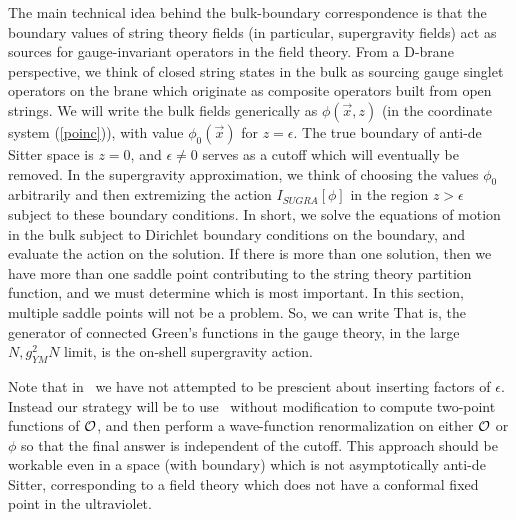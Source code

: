 The main technical idea behind the bulk-boundary correspondence is that the
boundary values of string theory fields (in particular, supergravity
fields) act as sources for gauge-invariant operators in the field theory.
From a D-brane perspective, we think of closed string states in the bulk as
sourcing gauge singlet operators on the brane which originate as composite
operators built from open strings.  We will write the bulk fields
generically as $\phi(\vec{x},z)$ (in the coordinate system
(\ref{poinc})), with value $\phi_0(\vec{x})$ for
$z=\epsilon$.  The true boundary of anti-de Sitter space is $z=0$, and
$\epsilon \neq 0$ serves as a cutoff which will eventually be removed.  In
the supergravity approximation, we think of choosing the values $\phi_0$
arbitrarily and then extremizing the action $I_{SUGRA}[\phi]$ in the
region $z > \epsilon$ subject to these boundary conditions.  In short, we
solve the equations of motion in the bulk subject to Dirichlet boundary
conditions on the boundary, and evaluate the action on the solution.  If
there is more than one solution, then we have more than one saddle point
contributing to the string theory partition function, and we must determine
which is most important.  In this section, multiple saddle points will not
be a problem.  So, we can write
  \def\extremum{\mathop{\rm extremum}}
  \eqn{WvsS}{
   W_{\rm gauge}[\phi_0] = -\log \left\langle
    e^{\int d^4 x \, \phi_0(x) {\cal O}(x)} \right\rangle_{CFT} \simeq
    \extremum_{\phi\big|_{z=\epsilon} = \phi_0} I_{SUGRA}[\phi] \ .
  }
 That is, the generator of connected Green's functions in the gauge theory,
in the large $N, g_{YM}^2 N$ limit, is the on-shell supergravity action.

Note that in \WvsS\ we have not attempted to be prescient about inserting
factors of $\epsilon$.  Instead our strategy will be to use \WvsS\ without
modification to compute two-point functions of ${\cal O}$, and then perform
a wave-function renormalization on either ${\cal O}$ or $\phi$ so that the
final answer is independent of the cutoff.  This approach should be
workable even in a space (with boundary) which is not asymptotically
anti-de Sitter, corresponding to a field theory which does not have a
conformal fixed point in the ultraviolet.

